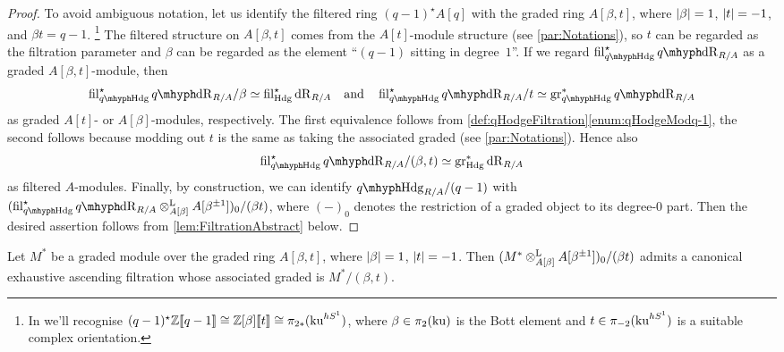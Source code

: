 \documentclass[DIV=12,numbers=enddot,leqno,bibliography=totoc]{scrartcl}
\begin{document}
	\begin{proof}
		To avoid ambiguous notation, let us identify the filtered ring $(q-1)^\star A[q]$ with the graded ring $A[\beta,t]$, where $\lvert\beta\rvert=1$, $\lvert t\rvert=-1$, and $\beta t=q-1$.%
		\footnote{In \cite{qdeRhamku} we'll recognise $(q-1)^\star \mathbb{Z}\llbracket q-1\rrbracket\cong \mathbb{Z}[\beta]\llbracket t\rrbracket\cong \pi_{2*}(\mathrm{ku}^{h S^1})$, where $\beta\in\pi_2(\mathrm{ku})$ is the Bott element and $t\in \pi_{-2}(\mathrm{ku}^{h S^1})$ is a suitable complex orientation.}
		The filtered structure on $A[\beta,t]$ comes from the $A[t]$-module structure (see \cref{par:Notations}), so $t$ can be regarded as the filtration parameter and $\beta$ can be regarded as the element \enquote{$(q-1)$ sitting in degree~$1$}. If we regard $ \fil_{\qHodge}^\star\qdeRham_{R/A}$ as a graded $A[\beta,t]$-module, then
		\begin{equation*}
			\fil_{\qHodge}^\star\qdeRham_{R/A}/\beta\simeq  \fil_{\Hodge}^\star\deRham_{R/A}\quad\text{and}\quad  \fil_{\qHodge}^\star\qdeRham_{R/A}/t\simeq \gr_{\qHodge}^*\qdeRham_{R/A}
		\end{equation*}
		as graded $A[t]$- or $A[\beta]$-modules, respectively. The first equivalence follows from \cref{def:qHodgeFiltration}\cref{enum:qHodgeModq-1}, the second follows because modding out $t$ is the same as taking the associated graded (see \cref{par:Notations}). Hence also
		\begin{equation*}
			\fil_{\qHodge}^\star \qdeRham_{R/A}/(\beta,t)\simeq \gr_{\Hodge}^*\deRham_{R/A}
		\end{equation*}
		as filtered $A$-modules. Finally, by construction, we can identify $\qHodge_{R/A}/(q-1)$ with $( \fil_{\qHodge}^\star\qdeRham_{R/A}\lotimes_{A[\beta]}A[\beta^{\pm 1}])_0/(\beta t)$, where $(-)_0$ denotes the restriction of a graded object to its degree-$0$ part. Then the desired assertion follows from \cref{lem:FiltrationAbstract} below. 
	\end{proof}
	\begin{lem}\label{lem:FiltrationAbstract}
		Let $M^*$ be a graded module over the graded ring $A[\beta,t]$, where $\lvert\beta\rvert=1$, $\lvert t\rvert=-1$. Then $(M^*\otimes^{\mathrm{L}}_{A[\beta]}A[\beta^{\pm 1}])_0/(\beta t)$ admits a canonical exhaustive ascending filtration whose associated graded is $M^*/(\beta,t)$.
	\end{lem}
\end{document}
